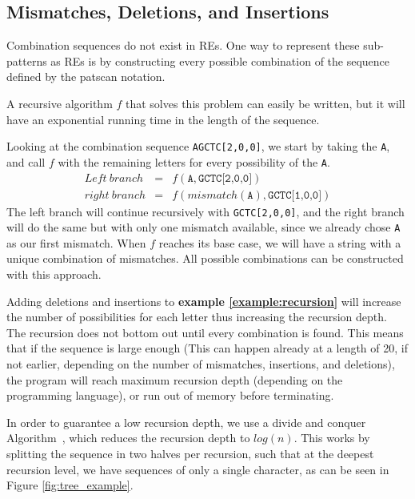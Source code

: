 \documentclass[12pt]{article}
\theoremstyle{definition}
\begin{document}
\subsection{Mismatches, Deletions, and Insertions}

Combination sequences do not exist in REs. One way to represent these sub-patterns as REs is by constructing every possible combination of the sequence defined by the patscan notation.

A recursive algorithm $f$ that solves this problem can easily be written, but it will have an exponential running time in the length of the sequence. 

\begin{example}[label=example:recursion]
Looking at the combination sequence \texttt{AGCTC[2,0,0]}, we start by taking the \texttt{A}, and call $f$ with the remaining letters for every possibility of the \texttt{A}.
\begin{eqnarray}
	Left\ branch &=& f(\texttt{A}, \texttt{GCTC[2,0,0]}) \\
	right\ branch &=& f(mismatch(\texttt{A}), \texttt{GCTC[1,0,0]})
\end{eqnarray}
The left branch will continue recursively with \texttt{GCTC[2,0,0]}, and the right branch will do the same but with only one mismatch available, since we already chose \texttt{A} as our first mismatch. When $f$ reaches its base case, we will have a string with a unique combination of mismatches. All possible combinations can be constructed with this approach.
\end{example}

Adding deletions and insertions to \textbf{example \ref{example:recursion}} will increase the number of possibilities for each letter thus increasing the recursion depth. The recursion does not bottom out until every combination is found. This means that if the sequence is large enough (This can happen already at a length of 20, if not earlier, depending on the number of mismatches, insertions, and deletions), the program will reach maximum recursion depth (depending on the programming language), or run out of memory before terminating.

In order to guarantee a low recursion depth, we use a divide and conquer Algorithm~\cite{Algorithms}, which reduces the recursion depth to $log(n)$. This works by splitting the sequence in two halves per recursion, such that at the deepest recursion level, we have sequences of only a single character, as can be seen in Figure \ref{fig:tree_example}. 
\end{document}
